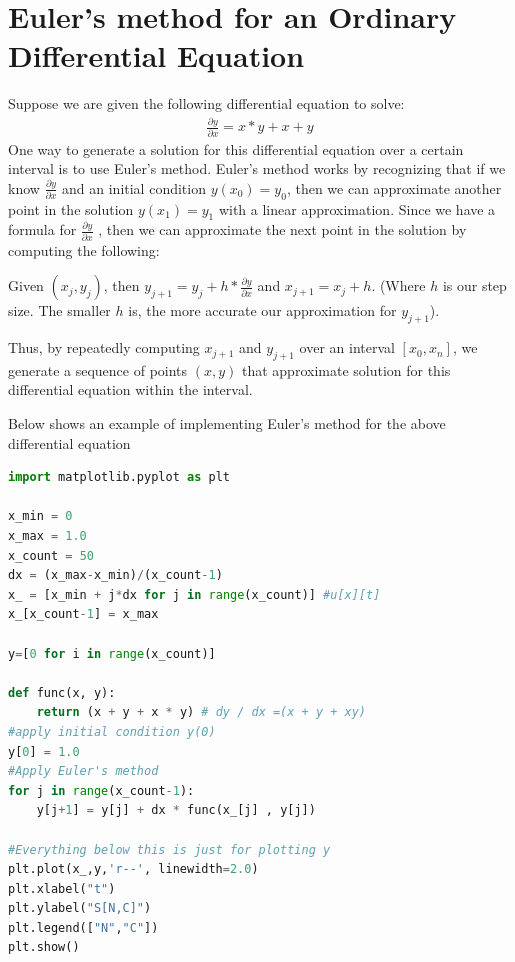 \documentclass[11pt]{article}
\begin{document}
\newpage

\section*{Euler's method for an Ordinary Differential Equation}

Suppose we are given the following differential equation to solve:
\begin{align*}
    \frac{\partial y}{\partial x} = x*y + x + y
\end{align*}
One way to generate a solution for this differential equation over a certain interval is to use Euler's method. Euler's method works by recognizing that if we know $\frac{\partial y}{\partial x}$ and an initial condition $y(x_0) = y_0$, then we can approximate another point in the solution $y(x_1) = y_1$ with a linear approximation. Since we have a formula for $\frac{\partial y}{\partial x}$ , then we can approximate the next point in the solution by computing the following:

Given $(x_{j},y_{j})$, then $y_{j+1} = y_j + h*\frac{\partial y}{\partial x}$ and $x_{j+1} = x_j + h$. (Where $h$ is our step size. The smaller $h$ is, the more accurate our approximation for $y_{j+1}$).

Thus, by repeatedly computing $x_{j+1}$ and $y_{j+1}$ over an interval $[x_0,x_n]$, we generate a sequence of points $(x,y)$ that approximate solution for this differential equation within the interval.

Below shows an example of implementing Euler's method for the above differential equation
\begin{lstlisting}[language=Python]
import matplotlib.pyplot as plt

x_min = 0
x_max = 1.0
x_count = 50
dx = (x_max-x_min)/(x_count-1)
x_ = [x_min + j*dx for j in range(x_count)] #u[x][t]
x_[x_count-1] = x_max

y=[0 for i in range(x_count)]

def func(x, y):
    return (x + y + x * y) # dy / dx =(x + y + xy)
#apply initial condition y(0)
y[0] = 1.0
#Apply Euler's method
for j in range(x_count-1):
    y[j+1] = y[j] + dx * func(x_[j] , y[j])

#Everything below this is just for plotting y
plt.plot(x_,y,'r--', linewidth=2.0)
plt.xlabel("t")
plt.ylabel("S[N,C]")
plt.legend(["N","C"])
plt.show()
\end{lstlisting}

\newpage
\end{document}

